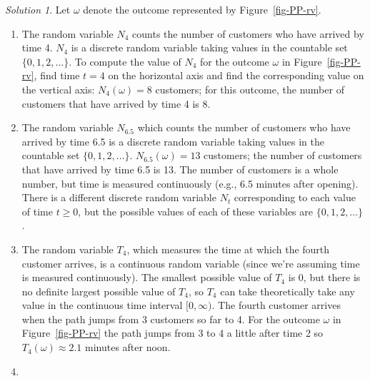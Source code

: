 \documentclass[
  letterpaper,
  DIV=11,
  numbers=noendperiod]{scrreprt}
\providecommand{\tightlist}{%
  \setlength{\itemsep}{0pt}\setlength{\parskip}{0pt}}
\theoremstyle{plain}
\theoremstyle{definition}
\theoremstyle{definition}
\theoremstyle{definition}
\theoremstyle{remark}
\newtheorem{refsolution}{Solution}[chapter]
\begin{document}
\begin{tcolorbox}[enhanced jigsaw, opacityback=0, rightrule=.15mm, coltitle=black, colframe=quarto-callout-tip-color-frame, toprule=.15mm, colbacktitle=quarto-callout-tip-color!10!white, opacitybacktitle=0.6, left=2mm, toptitle=1mm, breakable, title={Solution (click to expand)}, bottomtitle=1mm, colback=white, leftrule=.75mm, titlerule=0mm, arc=.35mm, bottomrule=.15mm]

\begin{refsolution}
Let \(\omega\) denote the outcome represented by Figure~\ref{fig-PP-rv}.

\begin{enumerate}
\def\labelenumi{\arabic{enumi}.}
\tightlist
\item
  The random variable \(N_4\) counts the number of customers who have
  arrived by time 4. \(N_4\) is a discrete random variable taking values
  in the countable set \(\{0, 1, 2, \ldots \}\). To compute the value of
  \(N_4\) for the outcome \(\omega\) in Figure~\ref{fig-PP-rv}, find
  time \(t=4\) on the horizontal axis and find the corresponding value
  on the vertical axis: \(N_4(\omega)=8\) customers; for this outcome,
  the number of customers that have arrived by time 4 is 8.
\item
  The random variable \(N_{6.5}\) which counts the number of customers
  who have arrived by time 6.5 is a discrete random variable taking
  values in the countable set \(\{0, 1, 2, \ldots \}\).
  \(N_{6.5}(\omega)=13\) customers; the number of customers that have
  arrived by time 6.5 is 13. The number of customers is a whole number,
  but time is measured continuously (e.g., 6.5 minutes after opening).
  There is a different discrete random variable \(N_t\) corresponding to
  each value of time \(t\ge 0\), but the possible values of each of
  these variables are \(\{0, 1, 2, \ldots\}\).
\item
  The random variable \(T_4\), which measures the time at which the
  fourth customer arrives, is a continuous random variable (since we're
  assuming time is measured continuously). The smallest possible value
  of \(T_4\) is 0, but there is no definite largest possible value of
  \(T_4\), so \(T_4\) can take theoretically take any value in the
  continuous time interval \([0, \infty)\). The fourth customer arrives
  when the path jumps from 3 customers so far to 4. For the outcome
  \(\omega\) in Figure~\ref{fig-PP-rv} the path jumps from 3 to 4 a
  little after time 2 so \(T_4(\omega)\approx 2.1\) minutes after noon.
\item

\end{enumerate}
\end{refsolution}
\end{tcolorbox}
\end{document}
